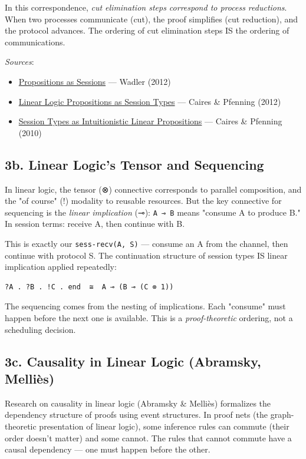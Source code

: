 \documentclass[11pt]{article}
\begin{document}
In this correspondence, \emph{cut elimination steps correspond to process reductions}.
When two processes communicate (cut), the proof simplifies (cut reduction), and
the protocol advances. The ordering of cut elimination steps IS the ordering of
communications.

\emph{Sources}:
\begin{itemize}
\item \href{https://homepages.inf.ed.ac.uk/wadler/papers/propositions-as-sessions/propositions-as-sessions.pdf}{Propositions as Sessions} — Wadler (2012)
\item \href{https://www.cs.cmu.edu/\~fp/papers/mscs13.pdf}{Linear Logic Propositions as Session Types} — Caires \& Pfenning (2012)
\item \href{https://link.springer.com/chapter/10.1007/978-3-642-15375-4\_16}{Session Types as Intuitionistic Linear Propositions} — Caires \& Pfenning (2010)
\end{itemize}
\subsection{3b. Linear Logic's Tensor and Sequencing}
\label{sec:org6dfc091}

In linear logic, the tensor (⊗) connective corresponds to parallel composition,
and the "of course" (!) modality to reusable resources. But the key connective
for sequencing is the \emph{linear implication} (⊸): \texttt{A ⊸ B} means "consume A to
produce B." In session terms: receive A, then continue with B.

This is exactly our \texttt{sess-recv(A, S)} — consume an A from the channel, then
continue with protocol S. The continuation structure of session types IS linear
implication applied repeatedly:

\begin{verbatim}
?A . ?B . !C . end  ≅  A ⊸ (B ⊸ (C ⊗ 1))
\end{verbatim}

The sequencing comes from the nesting of implications. Each "consume" must
happen before the next one is available. This is a \emph{proof-theoretic} ordering,
not a scheduling decision.
\subsection{3c. Causality in Linear Logic (Abramsky, Melliès)}
\label{sec:org294af75}

Research on causality in linear logic (Abramsky \& Melliès) formalizes the
dependency structure of proofs using event structures. In proof nets
(the graph-theoretic presentation of linear logic), some inference rules can
commute (their order doesn't matter) and some cannot. The rules that cannot
commute have a causal dependency — one must happen before the other.
\end{document}
